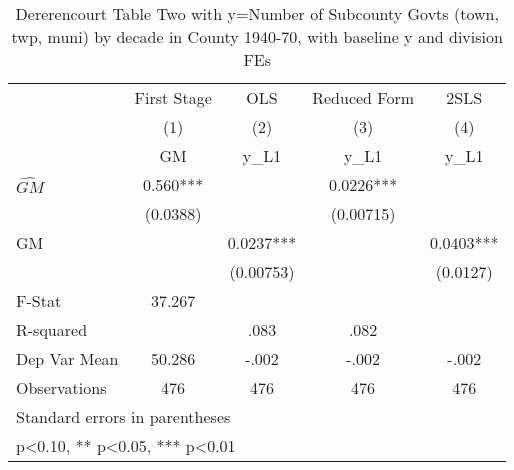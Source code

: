 \begin{table}[htbp]\centering
\def\sym#1{\ifmmode^{#1}\else\(^{#1}\)\fi}
\caption{Dererencourt Table Two with y=Number of Subcounty Govts (town, twp, muni) by decade in County 1940-70, with baseline y and division FEs}
\begin{tabular}{l*{4}{c}}
\toprule
                    & First Stage   &         OLS   &Reduced Form   &        2SLS   \\
                    &\multicolumn{1}{c}{(1)}&\multicolumn{1}{c}{(2)}&\multicolumn{1}{c}{(3)}&\multicolumn{1}{c}{(4)}\\
                    &\multicolumn{1}{c}{GM}&\multicolumn{1}{c}{y\_L1}&\multicolumn{1}{c}{y\_L1}&\multicolumn{1}{c}{y\_L1}\\
\midrule
$\hat{GM}$          &       0.560***&               &      0.0226***&               \\
                    &    (0.0388)   &               &   (0.00715)   &               \\
\addlinespace
GM                  &               &      0.0237***&               &      0.0403***\\
                    &               &   (0.00753)   &               &    (0.0127)   \\
\midrule
F-Stat              &      37.267   &               &               &               \\
R-squared           &               &        .083   &        .082   &               \\
Dep Var Mean        &      50.286   &       -.002   &       -.002   &       -.002   \\
Observations        &         476   &         476   &         476   &         476   \\
\bottomrule
\multicolumn{5}{l}{\footnotesize Standard errors in parentheses}\\
\multicolumn{5}{l}{\footnotesize * p<0.10, ** p<0.05, *** p<0.01}\\
\end{tabular}
\end{table}
